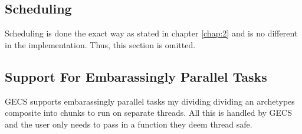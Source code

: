 \subsection{Scheduling}
Scheduling is done the exact way as stated in chapter \ref{chap:2} and is no different in the implementation. Thus, this section is omitted.

\subsection{Support For Embarassingly Parallel Tasks}
GECS supports embarassingly parallel tasks my dividing dividing an archetypes composite into chunks to run on separate threads. All this is handled by GECS and the user only needs to pass in a function they deem thread safe.